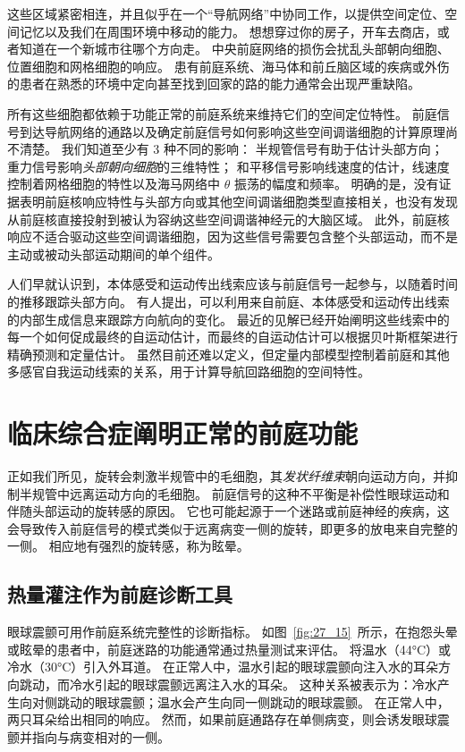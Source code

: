 这些区域紧密相连，并且似乎在一个“导航网络”中协同工作，以提供空间定位、空间记忆以及我们在周围环境中移动的能力。
想想穿过你的房子，开车去商店，或者知道在一个新城市往哪个方向走。
中央前庭网络的损伤会扰乱头部朝向细胞、位置细胞和网格细胞的响应。
患有前庭系统、海马体和前丘脑区域的疾病或外伤的患者在熟悉的环境中定向甚至找到回家的路的能力通常会出现严重缺陷。


所有这些细胞都依赖于功能正常的前庭系统来维持它们的空间定位特性。
前庭信号到达导航网络的通路以及确定前庭信号如何影响这些空间调谐细胞的计算原理尚不清楚。
我们知道至少有 3 种不同的影响： 半规管信号有助于估计头部方向；
重力信号影响\textit{头部朝向细胞}的三维特性；
和平移信号影响线速度的估计，线速度控制着网格细胞的特性以及海马网络中 $\theta$ 振荡的幅度和频率。
明确的是，没有证据表明前庭核响应特性与头部方向或其他空间调谐细胞类型直接相关，也没有发现从前庭核直接投射到被认为容纳这些空间调谐神经元的大脑区域。
此外，前庭核响应不适合驱动这些空间调谐细胞，因为这些信号需要包含整个头部运动，而不是主动或被动头部运动期间的单个组件。


人们早就认识到，本体感受和运动传出线索应该与前庭信号一起参与，以随着时间的推移跟踪头部方向。
有人提出，可以利用来自前庭、本体感受和运动传出线索的内部生成信息来跟踪方向航向的变化。
最近的见解已经开始阐明这些线索中的每一个如何促成最终的自运动估计，而最终的自运动估计可以根据贝叶斯框架进行精确预测和定量估计。
虽然目前还难以定义，但定量内部模型控制着前庭和其他多感官自我运动线索的关系，用于计算导航回路细胞的空间特性。



\section{临床综合症阐明正常的前庭功能}

正如我们所见，旋转会刺激半规管中的毛细胞，其\textit{发状纤维束}朝向运动方向，并抑制半规管中远离运动方向的毛细胞。
前庭信号的这种不平衡是补偿性眼球运动和伴随头部运动的旋转感的原因。
它也可能起源于一个迷路或前庭神经的疾病，这会导致传入前庭信号的模式类似于远离病变一侧的旋转，即更多的放电来自完整的一侧。
相应地有强烈的旋转感，称为眩晕。



\subsection{热量灌注作为前庭诊断工具}

眼球震颤可用作前庭系统完整性的诊断指标。
如图~\ref{fig:27_15}~所示，在抱怨头晕或眩晕的患者中，前庭迷路的功能通常通过热量测试来评估。
将温水（44°C）或冷水（30°C）引入外耳道。
在正常人中，温水引起的眼球震颤向注入水的耳朵方向跳动，而冷水引起的眼球震颤远离注入水的耳朵。
这种关系被表示为：冷水产生向对侧跳动的眼球震颤；温水会产生向同一侧跳动的眼球震颤。
在正常人中，两只耳朵给出相同的响应。
然而，如果前庭通路存在单侧病变，则会诱发眼球震颤并指向与病变相对的一侧。


